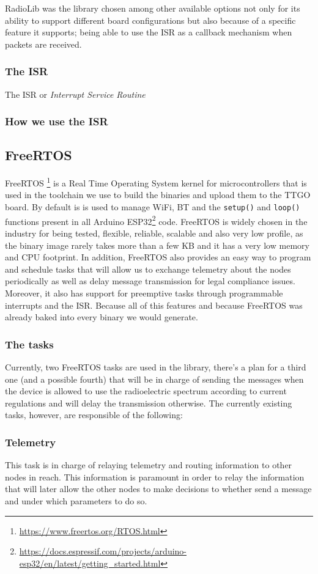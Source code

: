 RadioLib was the library chosen among other available options not only for its ability to support different board configurations but also because of a specific feature it supports; being able to use the ISR as a callback mechanism when packets are received.
\subsubsection{The ISR}
The ISR or \textit{Interrupt Service Routine}
\subsubsection{How we use the ISR}
\subsection{FreeRTOS}
FreeRTOS \footnote{\url{https://www.freertos.org/RTOS.html}} is a Real Time Operating System kernel for microcontrollers that is used in the toolchain we use to build the binaries and upload them to the TTGO board. By default is is used to manage WiFi, BT and the \texttt{setup()} and \texttt{loop()} functions present in all Arduino ESP32\footnote{\url{https://docs.espressif.com/projects/arduino-esp32/en/latest/getting_started.html}} code. FreeRTOS is widely chosen in the industry for being tested, flexible, reliable, scalable and also very low profile, as the binary image rarely takes more than a few KB and it has a very low memory and CPU footprint\cite{FreeRTOSCharacteristics}. In addition, FreeRTOS also provides an easy way to program and schedule tasks that will allow us to exchange telemetry about the nodes periodically as well as delay message transmission for legal compliance issues. Moreover, it also has support for preemptive tasks through programmable interrupts and the ISR.
Because all of this features and because FreeRTOS was already baked into every binary we would generate.
\subsubsection{The tasks}
Currently, two FreeRTOS tasks are used in the library, there's a plan for a third one (and a possible fourth) that will be in charge of sending the messages when the device is allowed to use the radioelectric spectrum according to current regulations and will delay the transmission otherwise. The currently existing tasks, however, are responsible of the following:
\subsubsection*{Telemetry}
This task is in charge of relaying telemetry and routing information to other nodes in reach. This information is paramount in order to relay the information that will later allow the other nodes to make decisions to whether send a message and under which parameters to do so.

